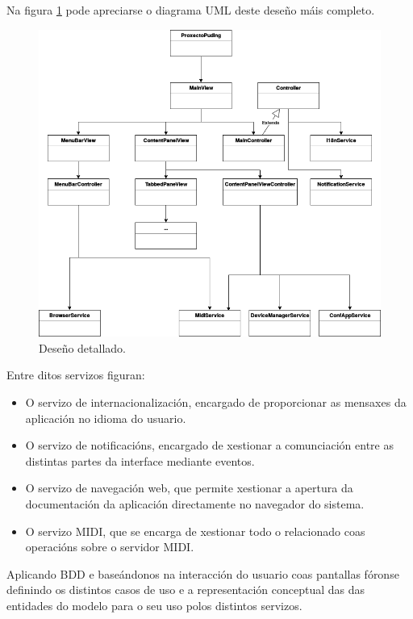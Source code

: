   Na figura \ref{figura:DesenoBaixoNivel} pode apreciarse o diagrama UML deste
  deseño máis completo.
  
  \begin{figure}[htbp]
    \centering
    \includegraphics[scale=0.5, keepaspectratio=true]{./imagenes/deseno-bn.png}
    \caption{Deseño detallado.}
    \label{figura:DesenoBaixoNivel}
   \end{figure}
  
  Entre ditos servizos figuran:
   
   \begin{itemize}
    \item O servizo de internacionalización, encargado de proporcionar as
        mensaxes da aplicación no idioma do usuario.
    \item O servizo de notificacións, encargado de xestionar a comunciación
        entre as distintas partes da interface mediante eventos.
    \item O servizo de navegación web, que permite xestionar a apertura da
        documentación da aplicación directamente no navegador do sistema.
    \item O servizo MIDI, que se encarga de xestionar todo o relacionado coas
        operacións sobre o servidor MIDI.
   \end{itemize}
   
   Aplicando BDD e baseándonos na interacción do usuario coas pantallas fóronse
   definindo os distintos casos de uso e a representación conceptual das
   das entidades do modelo para o seu uso polos distintos servizos. \\
   
